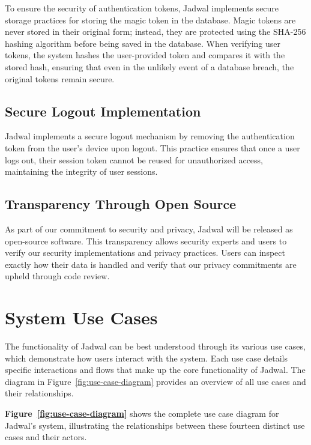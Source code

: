 \documentclass[12pt,a4paper]{report}
\begin{document}
To ensure the security of authentication tokens, Jadwal implements secure storage practices for storing the magic token in the database. Magic tokens are never stored in their original form; instead, they are protected using the SHA-256 hashing algorithm before being saved in the database. When verifying user tokens, the system hashes the user-provided token and compares it with the stored hash, ensuring that even in the unlikely event of a database breach, the original tokens remain secure.

\subsection{Secure Logout Implementation}

Jadwal implements a secure logout mechanism by removing the authentication token from the user's device upon logout. This practice ensures that once a user logs out, their session token cannot be reused for unauthorized access, maintaining the integrity of user sessions.

\subsection{Transparency Through Open Source}

As part of our commitment to security and privacy, Jadwal will be released as open-source software. This transparency allows security experts and users to verify our security implementations and privacy practices. Users can inspect exactly how their data is handled and verify that our privacy commitments are upheld through code review.


\section{System Use Cases}
The functionality of Jadwal can be best understood through its various use cases, which demonstrate how users interact with the system. Each use case details specific interactions and flows that make up the core functionality of Jadwal. The diagram in Figure~\ref{fig:use-case-diagram} provides an overview of all use cases and their relationships.

\textbf{Figure~\ref{fig:use-case-diagram}} shows the complete use case diagram for Jadwal's system, illustrating the relationships between these fourteen distinct use cases and their actors.
\end{document}
